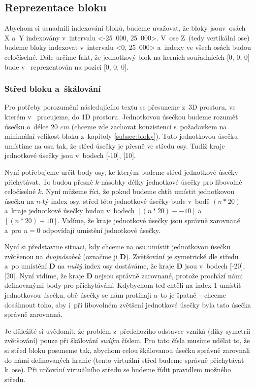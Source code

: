 \subsection{Reprezentace bloku}

Abychom si usnadnili indexování bloků, budeme uvažovat, že bloky jsou\linebreak v~osách X a~Y indexovány v~intervalu <-25~000, 25~000>. V~ose Z~(tedy vertikální ose) budeme bloky indexovat v~intervalu <0, 25~000> a~indexy ve všech osách budou celočíselné. Dále určíme fakt, že jednotkový blok na herních souřadnicích [0, 0, 0] bude v~\UEu{} reprezentován na pozici [0, 0, 0]. 

\subsubsection{Střed bloku a~škálování}
Pro potřeby porozumění následujícího textu se přesuneme z~3D prostoru, ve kterém v~\UEu{} pracujeme, do 1D prostoru. Jednotkovou úsečkou budeme rozumět úsečku o~délce $20\,\ cm$ (chceme zde zachovat konzistenci s~požadavkem na minimální velikost bloku z~kapitoly \ref{subsec:bloky}). Tuto jednotkovou úsečku umístíme na osu tak, že střed úsečky je přesně ve středu osy. Tudíž kraje jednotkové úsečky jsou v~bodech [-10], [10].

Nyní potřebujeme určit body osy, ke kterým budeme střed jednotkové úsečky přichytávat. To budou přesně $k$-násobky délky jednotkové úsečky pro libovolné celočíselné $k$. Nyní můžeme říci, že pokud budeme chtít umístit jednotkovou úsečku na $n$-tý index osy, střed této jednotkové úsečky bude v~bodě $(n * 20)$ a~kraje jednotkové úsečky budou v~bodech $[(n * 20) -- 10]$ a~$[(n * 20) + 10]$. Vidíme, že kraje jednotkové úsečky jsou správně zarovnané a~pro $n = 0$ odpovídají umístění jednotkové úsečky.

Nyní si představme situaci, kdy chceme na osu umístit jednotkovou úsečku zvětšenou na \textit{dvojnásobek} (označme ji \textbf{D}). Zvětšování je symetrické dle středu a~po umístění \textbf{D} na \textit{nultý} index osy dostáváme, že kraje \textbf{D} jsou v~bodech [-20], [20]. Nyní vidíme, že kraje \textbf{D} nejsou správně zarovnané, protože prochází námi definovanými body pro přichytávání. Kdybychom teď chtěli na index 1 umístit jednotkovou úsečku, obě úsečky se nám protínají a~to je špatně -- chceme dosáhnout toho, aby i~při libovolném zvětšení jednotkové úsečky byla tato úsečka správně zarovnaná.

Je důležité si uvědomit, že problém z~předchozího odstavce vzniká (díky symetrii zvětšování) pouze při škálování \textit{sudým} číslem. Pro tato čísla musíme udělat to, že si střed bloku  posuneme tak, abychom celou škálovanou úsečku správně zarovnali do námi definovaných hranic (tento virtuální střed budeme správně přichytávat k~ose). Při určování virtuálního středu se budeme řídit pravidlem  možného středu. 

